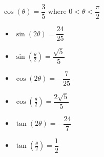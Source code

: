 {$\cos(\theta) = \dfrac{3}{5}$ where $0 < \theta < \dfrac{\pi}{2}$}
{\begin{itemize}
\item $\sin(2\theta) = \dfrac{24}{25}$
\item $\sin\left(\frac{\theta}{2}\right) = \dfrac{\sqrt{5}}{5}$
\item $\cos(2\theta) = -\dfrac{7}{25}$
\item $\cos\left(\frac{\theta}{2}\right) = \dfrac{2\sqrt{5}}{5}$
\item $\tan(2\theta)=-\dfrac{24}{7} $
\item $\tan\left(\frac{\theta}{2}\right) = \dfrac{1}{2}$
\end{itemize}}